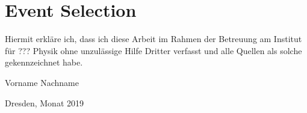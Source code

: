     \section{Event Selection}
        

\clearpage
\thispagestyle{empty}
\vspace*{1.5em}

Hiermit erkläre ich, dass ich diese Arbeit im Rahmen der Betreuung am Institut
für ??? Physik ohne unzulässige Hilfe Dritter verfasst und alle Quellen als solche gekennzeichnet habe.

\vspace*{45em}

Vorname Nachname \par
Dresden, Monat 2019
